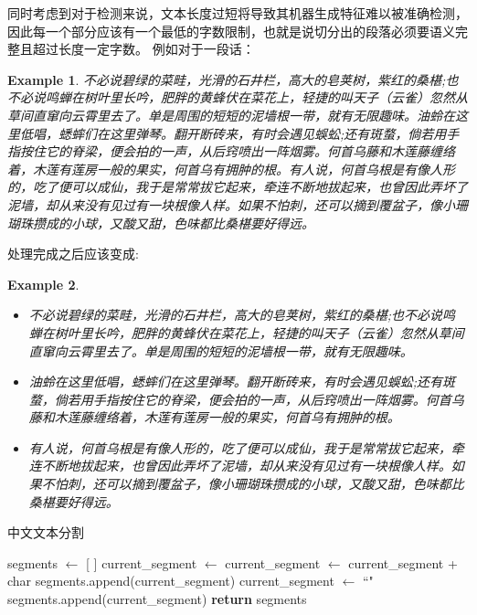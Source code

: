 \documentclass[a4paper]{report}
\newtheorem{example}{Example}
\begin{document}
同时考虑到对于检测来说，文本长度过短将导致其机器生成特征难以被准确检测，因此每一个部分应该有一个最低的字数限制，也就是说切分出的段落必须要语义完整且超过长度一定字数。
例如对于一段话：
\begin{example}
	不必说碧绿的菜畦，光滑的石井栏，高大的皂荚树，紫红的桑椹;也不必说鸣蝉在树叶里长吟，肥胖的黄蜂伏在菜花上，轻捷的叫天子（云雀）忽然从草间直窜向云霄里去了。单是周围的短短的泥墙根一带，就有无限趣味。油蛉在这里低唱，蟋蟀们在这里弹琴。翻开断砖来，有时会遇见蜈蚣;还有斑蝥，倘若用手指按住它的脊梁，便会拍的一声，从后窍喷出一阵烟雾。何首乌藤和木莲藤缠络着，木莲有莲房一般的果实，何首乌有拥肿的根。有人说，何首乌根是有像人形的，吃了便可以成仙，我于是常常拔它起来，牵连不断地拔起来，也曾因此弄坏了泥墙，却从来没有见过有一块根像人样。如果不怕刺，还可以摘到覆盆子，像小珊瑚珠攒成的小球，又酸又甜，色味都比桑椹要好得远。
\end{example}
处理完成之后应该变成:
\begin{example}
	\begin{itemize}
		\item 不必说碧绿的菜畦，光滑的石井栏，高大的皂荚树，紫红的桑椹;也不必说鸣蝉在树叶里长吟，肥胖的黄蜂伏在菜花上，轻捷的叫天子（云雀）忽然从草间直窜向云霄里去了。单是周围的短短的泥墙根一带，就有无限趣味。
		\item 油蛉在这里低唱，蟋蟀们在这里弹琴。翻开断砖来，有时会遇见蜈蚣;还有斑蝥，倘若用手指按住它的脊梁，便会拍的一声，从后窍喷出一阵烟雾。何首乌藤和木莲藤缠络着，木莲有莲房一般的果实，何首乌有拥肿的根。
		\item 有人说，何首乌根是有像人形的，吃了便可以成仙，我于是常常拔它起来，牵连不断地拔起来，也曾因此弄坏了泥墙，却从来没有见过有一块根像人样。如果不怕刺，还可以摘到覆盆子，像小珊瑚珠攒成的小球，又酸又甜，色味都比桑椹要好得远。
	\end{itemize}
\end{example}
\begin{algorithm}[H]
	\caption{中文文本分割}
	\begin{algorithmic}[1]
		\State segments $\gets$ [ ]
		\State current\_segment $\gets$
		\State current\_segment $\gets$ current\_segment + char
		\State segments.append(current\_segment)
		\State current\_segment $\gets$ ``"
		\EndIf
		\EndFor
		\State segments.append(current\_segment)
		\EndIf
		\State \textbf{return} segments
		\EndProcedure
	\end{algorithmic}
\end{algorithm}
\end{document}
